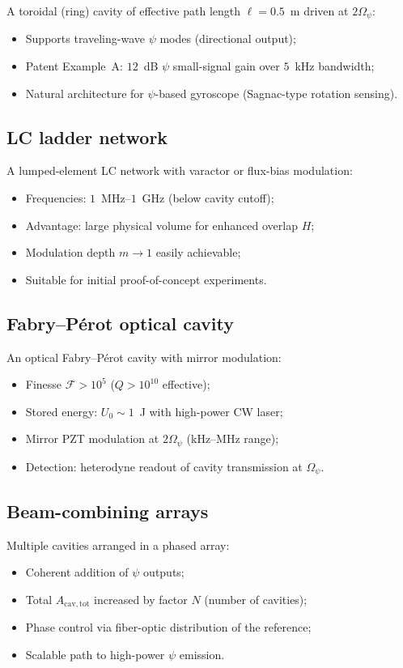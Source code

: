 \documentclass[12pt,aps,prd,twocolumn,superscriptaddress,nofootinbib]{revtex4-2}
\newcommand{\Opsi}{\Omega_\psi}
\newcommand{\Acav}{A_{\mathrm{cav,tot}}}
\begin{document}
A toroidal (ring) cavity of effective path length $\ell = 0.5$~m
driven at $2\Opsi$:
\begin{itemize}[noitemsep]
  \item Supports traveling-wave $\psi$ modes (directional output);
  \item Patent Example~A: $12$~dB $\psi$ small-signal gain over
    $5$~kHz bandwidth;
  \item Natural architecture for $\psi$-based gyroscope
    (Sagnac-type rotation sensing).
\end{itemize}

\subsection{LC ladder network}

A lumped-element LC network with varactor or flux-bias modulation:
\begin{itemize}[noitemsep]
  \item Frequencies: $1$~MHz--$1$~GHz (below cavity cutoff);
  \item Advantage: large physical volume for enhanced overlap $H$;
  \item Modulation depth $m \to 1$ easily achievable;
  \item Suitable for initial proof-of-concept experiments.
\end{itemize}

\subsection{Fabry--P\'erot optical cavity}

An optical Fabry--P\'erot cavity with mirror modulation:
\begin{itemize}[noitemsep]
  \item Finesse $\mathcal{F} > 10^5$ ($Q > 10^{10}$ effective);
  \item Stored energy: $U_0 \sim 1$~J with high-power CW laser;
  \item Mirror PZT modulation at $2\Opsi$ (kHz--MHz range);
  \item Detection: heterodyne readout of cavity transmission
    at $\Opsi$.
\end{itemize}

\subsection{Beam-combining arrays}

Multiple cavities arranged in a phased array:
\begin{itemize}[noitemsep]
  \item Coherent addition of $\psi$ outputs;
  \item Total $\Acav$ increased by factor $N$ (number of cavities);
  \item Phase control via fiber-optic distribution of the reference;
  \item Scalable path to high-power $\psi$ emission.
\end{itemize}
\end{document}
